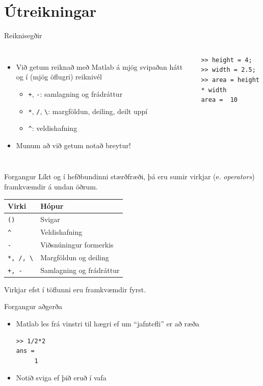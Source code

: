 \documentclass{beamer}
\begin{document}
\section{Útreikningar}

\begin{frame}[fragile]{Reiknisegðir}
\begin{columns}
\begin{itemize}
 \item Við getum reiknað með Matlab á mjög svipaðan hátt og í (mjög öflugri) reiknivél
 \begin{itemize}
  \item \texttt{+}, \texttt{-}: samlagning og frádráttur
  \item \texttt{*}, \texttt{/}, \texttt{\textbackslash}: margföldun, deiling, deilt uppí
  \item \texttt{\^}: veldishafning
 \end{itemize}
 \item Munum að við getum notað breytur!
\end{itemize}
\begin{verbatim}
>> height = 4;
>> width = 2.5;
>> area = height * width
area =  10
\end{verbatim}
\end{columns}
\end{frame}

\begin{frame}{Forgangur}
Líkt og í hefðbundinni stærðfræði, þá eru sumir virkjar (e. \emph{operators}) framkvæmdir á undan öðrum.
\begin{center}
\begin{tabular}{ll}
\toprule
Virki&Hópur\\
\midrule
\texttt{()}&Svigar\\
\texttt{\^}&Veldishafning\\
\texttt{-}&Viðsnúningur formerkis\\
\texttt{*, /, \textbackslash}&Margföldun og deiling\\
\texttt{+, -}&Samlagning og frádráttur\\
\bottomrule
\end{tabular}
\end{center}
Virkjar efst í töflunni eru framkvæmdir fyrst.
\end{frame}

\begin{frame}[fragile]{Forgangur aðgerða}
\begin{itemize}
 \item Matlab les frá vinstri til hægri ef um ``jafntefli'' er að ræða
\begin{verbatim}
>> 1/2*2
ans =
     1
\end{verbatim}
 \item Notið sviga ef þið eruð í vafa
\end{itemize}
\end{frame}
\end{document}
